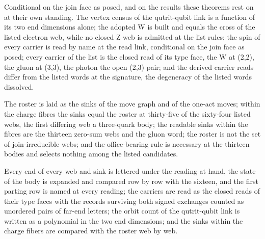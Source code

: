 \begin{chconditional}\label{box:IV-3-representations-from-the-open-end-census:4}
Conditional on the join face as posed, and on the results these theorems rest on at their own standing.
The vertex census of the qutrit-qubit link is a function of its two end dimensions alone; the adopted W is built and equals the cross of the listed electron web, while no closed Z web is admitted at the list rules; the spin of every carrier is read by name at the read link, conditional on the join face as posed; every carrier of the list is the closed read of its type face, the W at (2,2), the gluon at (3,3), the photon the open (2,3) pair; and the derived carrier reads differ from the listed words at the signature, the degeneracy of the listed words dissolved.
\end{chconditional}
\begin{chwall}\label{box:IV-3-representations-from-the-open-end-census:5}
The roster is laid as the sinks of the move graph and of the one-act moves; within the charge fibres the sinks equal the roster at thirty-five of the sixty-four listed webs, the first differing web a three-quark body; the readable sinks within the fibres are the thirteen zero-sum webs and the gluon word; the roster is not the set of join-irreducible webs; and the office-bearing rule is necessary at the thirteen bodies and selects nothing among the listed candidates.
\end{chwall}
Every end of every web and sink is lettered under the reading at hand, the state of the body is expanded and compared row by row with the sixteen, and the first parting row is named at every reading; the carriers are read as the closed reads of their type faces with the records surviving both signed exchanges counted as unordered pairs of far-end letters; the orbit count of the qutrit-qubit link is written as a polynomial in the two end dimensions; and the sinks within the charge fibers are compared with the roster web by web.

